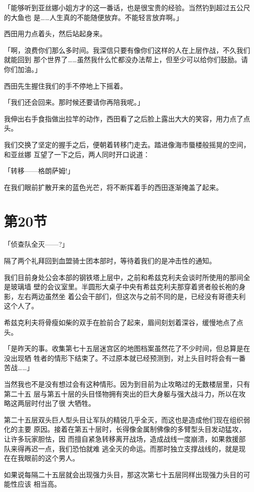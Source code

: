 \documentclass[11pt]{book}
\begin{document}
「能够听到亚丝娜小姐方才的这一番话，也是很宝贵的经验。当然钓到超过五公尺的大鱼也
是……人生真的不能随便放弃。不能轻言放弃啊。」

西田用力点着头，然后站起身来。

「啊，浪费你们那么多时间。我深信只要有像你们这样的人在上层作战，不久我们就能回到
那个世界了……虽然我什么忙都没办法帮上，但至少可以给你们鼓励。请你们加油。」

西田先生握住我们的手不停地上下摇着。

「我们还会回来。那时候还要请你再陪我呢。」

我伸出右手食指做出拉竿的动作，西田看了之后脸上露出大大的笑容，用力点了点头。

我们交换了坚定的握手之后，便朝着转移门走去。踏进像海市蜃楼般摇晃的空间，和亚丝娜
互望了一下之后，两人同时开口说道：

「转移——格朗萨姆!」

在我们眼前扩散开来的蓝色光芒，将不断挥着手的西田逐渐掩盖了起来。
\section{第20节}
\label{sec:orgc81f6ee}
「侦查队全灭——?」

隔了两个礼拜回到血盟骑士团本部时，等待着我们的是冲击性的通知。

我们目前身处公会本部的钢铁塔上层中，之前和希兹克利夫会谈时所使用的那间全是玻璃墙
壁的会议室里。半圆形大桌子中央有希兹克利夫那穿着贤者般长袍的身影，左右两边虽然坐
着公会干部们，但这次与之前不同的是，已经没有哥德夫利这个人了。

希兹克利夫将骨瘦如柴的双手在脸前合了起来，眉间刻划着深谷，缓慢地点了点头。

「是昨天的事。收集第七十五层迷宫区的地图档案虽然花了不少时间，但总算是在没出现牺
牲者的情形下结束了。不过原本就已经预测到，对上头目时将会有一番苦战……」

当然我也不是没有想过会有这种情形。因为到目前为止攻略过的无数楼层里，只有第二十五
层与第五十层的头目怪物拥有突出的巨大身躯与强大战斗力，所以在攻略这两层时付出了很
大牺牲。

第二十五层双头巨人型头目让军队的精锐几乎全灭，而这也是造成他们现在组织弱化的主要
原因。接着在第五十层时，长得像金属制佛像的多臂型头目发动猛攻，让许多玩家胆怯，因
而擅自紧急转移离开战场，造成战线一度崩溃，如果救援部队来得再迟一点，我们恐怕就难
逃全灭的命运。而那时独立支撑战线的，就是现在在我眼前的这个男人。

如果说每隔二十五层就会出现强力头目，那这次第七十五层同样出现强力头目的可能性应该
相当高。
\end{document}
